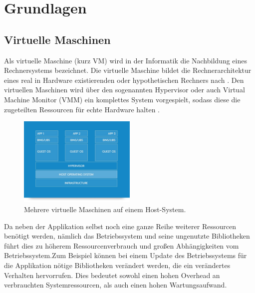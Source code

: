 \chapter{Grundlagen}


\section{Virtuelle Maschinen}
Als virtuelle Maschine (kurz VM) wird in der Informatik die Nachbildung eines Rechnersystems bezeichnet. Die virtuelle Maschine bildet die Rechnerarchitektur eines real in Hardware existierenden oder hypothetischen Rechners nach \cite{Sieg2007}. Den virtuellen Maschinen wird über den sogenannten Hypervisor oder auch Virtual Machine Monitor (VMM) ein komplettes System vorgespielt, sodass diese die zugeteilten Ressourcen für echte Hardware halten \cite{OSTEP}.\\

\begin{figure}[!ht] %
  \centering
  \includegraphics[width=0.5\textwidth]{images/docker-vm.jpg}
  \caption{Mehrere virtuelle Maschinen auf einem Host-System. \cite{docker}}
\end{figure}

Da neben der Applikation selbst noch eine ganze Reihe weiterer Ressourcen benötigt werden, nämlich das Betriebssystem und seine ungenutzte Bibliotheken führt dies zu höherem Ressourcenverbrauch und großen Abhängigkeiten vom Betriebssystem.\linebreak Zum Beispiel können bei einem Update des Betriebssystems für die Applikation nötige Bibliotheken verändert werden, die ein verändertes Verhalten hervorrufen. Dies bedeutet sowohl einen hohen Overhead an verbrauchten Systemressourcen, als auch einen hohen Wartungsaufwand.\\

